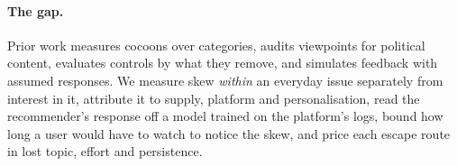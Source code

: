 \paragraph{The gap.} Prior work measures cocoons over categories, audits viewpoints for political content, evaluates controls by what they remove, and simulates feedback with assumed responses. We measure skew \emph{within} an everyday issue separately from interest in it, attribute it to supply, platform and personalisation, read the recommender's response off a model trained on the platform's logs, bound how long a user would have to watch to notice the skew, and price each escape route in lost topic, effort and persistence.
